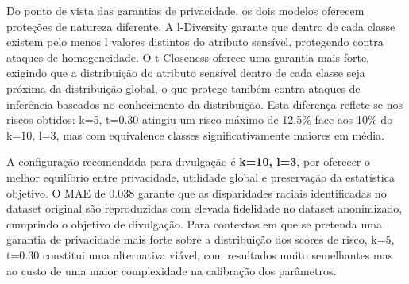 Do ponto de vista das garantias de privacidade, os dois modelos oferecem proteções de natureza diferente. A l-Diversity garante que dentro de cada classe existem pelo menos l valores distintos do atributo sensível, protegendo contra ataques de homogeneidade. O t-Closeness oferece uma garantia mais forte, exigindo que a distribuição do atributo sensível dentro de cada classe seja próxima da distribuição global, o que protege também contra ataques de inferência baseados no conhecimento da distribuição. Esta diferença reflete-se nos riscos obtidos: k=5, t=0.30 atingiu um risco máximo de 12.5\% face aos 10\% do k=10, l=3, mas com equivalence classes significativamente maiores em média.

A configuração recomendada para divulgação é \textbf{k=10, l=3}, por oferecer o melhor equilíbrio entre privacidade, utilidade global e preservação da estatística objetivo. O MAE de 0.038 garante que as disparidades raciais identificadas no dataset original são reproduzidas com elevada fidelidade no dataset anonimizado, cumprindo o objetivo de divulgação. Para contextos em que se pretenda uma garantia de privacidade mais forte sobre a distribuição dos scores de risco, k=5, t=0.30 constitui uma alternativa viável, com resultados muito semelhantes mas ao custo de uma maior complexidade na calibração dos parâmetros.
